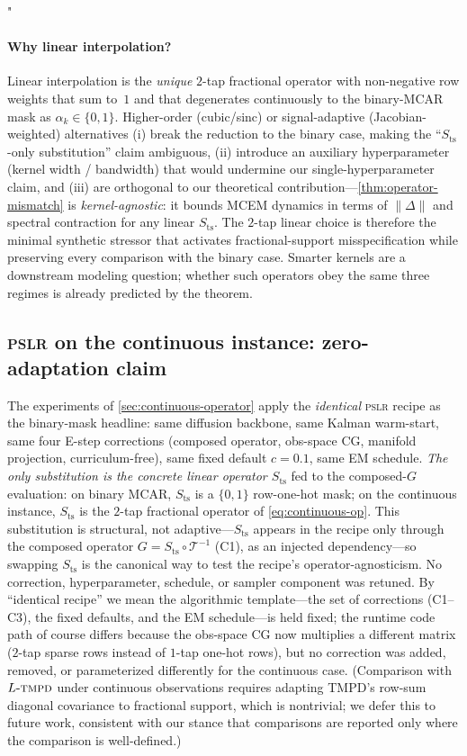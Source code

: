 "\documentclass{article}
\theoremstyle{plain}
\theoremstyle{definition}
\theoremstyle{remark}
\newcommand{\imgts}{\mathcal{T}^{-1}}
\newcommand{\pslr}{\textsc{pslr}}
\newcommand{\ltmpd}{L\mbox{-}\textsc{tmpd}}
\begin{document}
\paragraph{Why linear interpolation?}
Linear interpolation is the \emph{unique} $2$-tap fractional operator with non-negative row weights that sum to~$1$ and that degenerates continuously to the binary-MCAR mask as $\alpha_k \in \{0, 1\}$. Higher-order (cubic/sinc) or signal-adaptive (Jacobian-weighted) alternatives (i) break the reduction to the binary case, making the ``$S_{\mathrm{ts}}$-only substitution'' claim ambiguous, (ii) introduce an auxiliary hyperparameter (kernel width / bandwidth) that would undermine our single-hyperparameter claim, and (iii) are orthogonal to our theoretical contribution---\cref{thm:operator-mismatch} is \emph{kernel-agnostic}: it bounds MCEM dynamics in terms of $\|\Delta\|$ and spectral contraction for any linear $S_{\mathrm{ts}}$. The $2$-tap linear choice is therefore the minimal synthetic stressor that activates fractional-support misspecification while preserving every comparison with the binary case. Smarter kernels are a downstream modeling question; whether such operators obey the same three regimes is already predicted by the theorem.

\subsection{\pslr{} on the continuous instance: zero-adaptation claim}
\label{app:continuous-adaptation}

The experiments of \cref{sec:continuous-operator} apply the \emph{identical} \pslr{} recipe as the binary-mask headline: same diffusion backbone, same Kalman warm-start, same four E-step corrections (composed operator, obs-space CG, manifold projection, curriculum-free), same fixed default $c = 0.1$, same EM schedule. \emph{The only substitution is the concrete linear operator $S_{\mathrm{ts}}$} fed to the composed-$G$ evaluation: on binary MCAR, $S_{\mathrm{ts}}$ is a $\{0,1\}$ row-one-hot mask; on the continuous instance, $S_{\mathrm{ts}}$ is the $2$-tap fractional operator of \cref{eq:continuous-op}. This substitution is structural, not adaptive---$S_{\mathrm{ts}}$ appears in the recipe only through the composed operator $G = S_{\mathrm{ts}} \circ \imgts$ (C1), as an injected dependency---so swapping $S_{\mathrm{ts}}$ is the canonical way to test the recipe's operator-agnosticism. No correction, hyperparameter, schedule, or sampler component was retuned. By ``identical recipe'' we mean the algorithmic template---the set of corrections (C1--C3), the fixed defaults, and the EM schedule---is held fixed; the runtime code path of course differs because the obs-space CG now multiplies a different matrix ($2$-tap sparse rows instead of $1$-tap one-hot rows), but no correction was added, removed, or parameterized differently for the continuous case. (Comparison with $\ltmpd$ under continuous observations requires adapting TMPD's row-sum diagonal covariance to fractional support, which is nontrivial; we defer this to future work, consistent with our stance that comparisons are reported only where the comparison is well-defined.)
\end{document}
